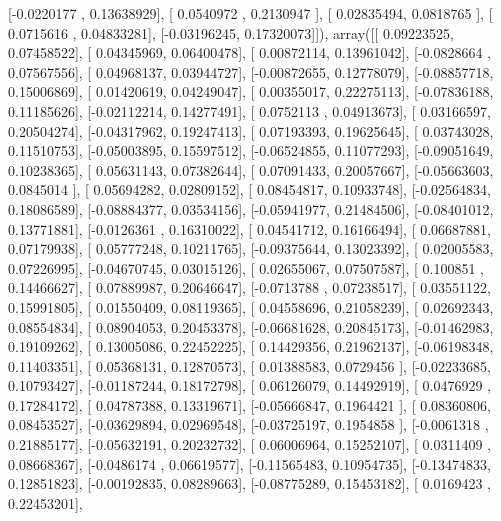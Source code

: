 \documentclass{article}
\begin{document}
       [-0.0220177 ,  0.13638929],
       [ 0.0540972 ,  0.2130947 ],
       [ 0.02835494,  0.0818765 ],
       [ 0.0715616 ,  0.04833281],
       [-0.03196245,  0.17320073]]), array([[ 0.09223525,  0.07458522],
       [ 0.04345969,  0.06400478],
       [ 0.00872114,  0.13961042],
       [-0.0828664 ,  0.07567556],
       [ 0.04968137,  0.03944727],
       [-0.00872655,  0.12778079],
       [-0.08857718,  0.15006869],
       [ 0.01420619,  0.04249047],
       [ 0.00355017,  0.22275113],
       [-0.07836188,  0.11185626],
       [-0.02112214,  0.14277491],
       [ 0.0752113 ,  0.04913673],
       [ 0.03166597,  0.20504274],
       [-0.04317962,  0.19247413],
       [ 0.07193393,  0.19625645],
       [ 0.03743028,  0.11510753],
       [-0.05003895,  0.15597512],
       [-0.06524855,  0.11077293],
       [-0.09051649,  0.10238365],
       [ 0.05631143,  0.07382644],
       [ 0.07091433,  0.20057667],
       [-0.05663603,  0.0845014 ],
       [ 0.05694282,  0.02809152],
       [ 0.08454817,  0.10933748],
       [-0.02564834,  0.18086589],
       [-0.08884377,  0.03534156],
       [-0.05941977,  0.21484506],
       [-0.08401012,  0.13771881],
       [-0.0126361 ,  0.16310022],
       [ 0.04541712,  0.16166494],
       [ 0.06687881,  0.07179938],
       [ 0.05777248,  0.10211765],
       [-0.09375644,  0.13023392],
       [ 0.02005583,  0.07226995],
       [-0.04670745,  0.03015126],
       [ 0.02655067,  0.07507587],
       [ 0.100851  ,  0.14466627],
       [ 0.07889987,  0.20646647],
       [-0.0713788 ,  0.07238517],
       [ 0.03551122,  0.15991805],
       [ 0.01550409,  0.08119365],
       [ 0.04558696,  0.21058239],
       [ 0.02692343,  0.08554834],
       [ 0.08904053,  0.20453378],
       [-0.06681628,  0.20845173],
       [-0.01462983,  0.19109262],
       [ 0.13005086,  0.22452225],
       [ 0.14429356,  0.21962137],
       [-0.06198348,  0.11403351],
       [ 0.05368131,  0.12870573],
       [ 0.01388583,  0.0729456 ],
       [-0.02233685,  0.10793427],
       [-0.01187244,  0.18172798],
       [ 0.06126079,  0.14492919],
       [ 0.0476929 ,  0.17284172],
       [ 0.04787388,  0.13319671],
       [-0.05666847,  0.1964421 ],
       [ 0.08360806,  0.08453527],
       [-0.03629894,  0.02969548],
       [-0.03725197,  0.1954858 ],
       [-0.0061318 ,  0.21885177],
       [-0.05632191,  0.20232732],
       [ 0.06006964,  0.15252107],
       [ 0.0311409 ,  0.08668367],
       [-0.0486174 ,  0.06619577],
       [-0.11565483,  0.10954735],
       [-0.13474833,  0.12851823],
       [-0.00192835,  0.08289663],
       [-0.08775289,  0.15453182],
       [ 0.0169423 ,  0.22453201],
\end{document}
